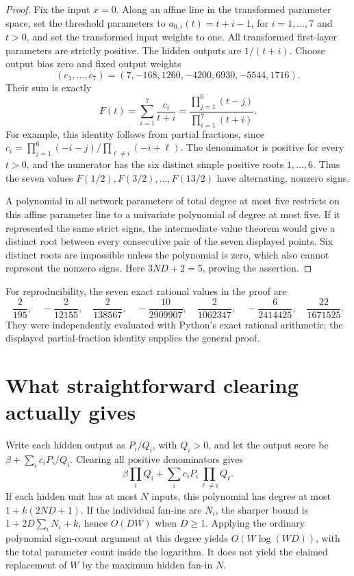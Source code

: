\documentclass[11pt]{article}
\begin{document}
\begin{proof}
Fix the input $x=0$. Along an affine line in the transformed parameter
space, set the threshold parameters to $a_{0,i}(t)=t+i-1$, for
$i=1,\ldots,7$ and $t>0$, and set the transformed input weights to one.
All transformed first-layer parameters are strictly positive. The hidden
outputs are $1/(t+i)$. Choose output bias zero and fixed output weights
\[
(c_1,\ldots,c_7)=(7,-168,1260,-4200,6930,-5544,1716).
\]
Their sum is exactly
\[
F(t)=\sum_{i=1}^7\frac{c_i}{t+i}
 =\frac{\prod_{j=1}^6(t-j)}{\prod_{i=1}^7(t+i)}.
\tag{1}
\]
For example, this identity follows from partial fractions, since
$c_i=\prod_{j=1}^6(-i-j)/\prod_{\ell\ne i}(-i+\ell)$.
The denominator is positive for every $t>0$, and the numerator has the
six distinct simple positive roots $1,\ldots,6$. Thus the seven values
$F(1/2),F(3/2),\ldots,F(13/2)$ have alternating, nonzero signs.

A polynomial in all network parameters of total degree at most five
restricts on this affine parameter line to a univariate polynomial of
degree at most five. If it represented the same strict signs, the
intermediate value theorem would give a distinct root between every
consecutive pair of the seven displayed points. Six distinct roots are
impossible unless the polynomial is zero, which also cannot represent
the nonzero signs. Here $3ND+2=5$, proving the assertion.
\end{proof}

For reproducibility, the seven exact rational values in the proof are
\[
\frac2{195},\quad-\frac2{12155},\quad\frac2{138567},\quad
-\frac{10}{2909907},\quad\frac2{1062347},\quad
-\frac6{2414425},\quad\frac{22}{1671525}.
\]
They were independently evaluated with Python's exact rational arithmetic;
the displayed partial-fraction identity supplies the general proof.

\section{What straightforward clearing actually gives}

Write each hidden output as $P_i/Q_i$, with $Q_i>0$, and let the output
score be $\beta+\sum_i c_i P_i/Q_i$. Clearing all positive denominators
gives
\[
\beta\prod_iQ_i+\sum_i c_iP_i\prod_{\ell\ne i}Q_\ell.
\]
If each hidden unit has at most $N$ inputs, this polynomial has degree at
most $1+k(2ND+1)$. If the individual fan-ins are $N_i$, the sharper bound
is $1+2D\sum_iN_i+k$, hence $O(DW)$ when $D\geq1$. Applying the ordinary
polynomial sign-count argument at this degree yields $O(W\log(WD))$,
with the total parameter count inside the logarithm. It does not yield
the claimed replacement of $W$ by the maximum hidden fan-in $N$.
\end{document}
